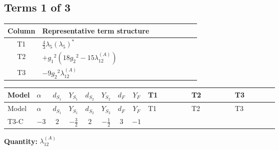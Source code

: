 \documentclass[8pt]{article}
\begin{document}
\begin{landscape}
\subsection*{Terms 1 of 3}
\begin{center}
\begin{tabular}{@{}c >{\raggedright\arraybackslash}p{0.82\linewidth}@{}}
\toprule
Column & Representative term structure \\
\midrule
T1 & \(\displaystyle \frac{4}{3} {\lambda_5} \left({\lambda_5}\right)^{*}\) \\
\midrule
T2 & \(\displaystyle +{g_1}^2 \left(18 {g_2}^2-15 {\lambda_{12}^{(A)}}\right)\) \\
\midrule
T3 & \(\displaystyle -9 {g_2}^2 {\lambda_{12}^{(A)}}\) \\
\midrule
\bottomrule
\end{tabular}
\end{center}
\smallskip
\tiny
\begin{longtable}{@{}llcccccc >{\raggedright\arraybackslash}p{0.21\linewidth} >{\raggedright\arraybackslash}p{0.21\linewidth} >{\raggedright\arraybackslash}p{0.21\linewidth}@{}}
\toprule
Model & $\alpha$ & $d_{S_1}$ & $Y_{S_1}$ & $d_{S_2}$ & $Y_{S_2}$ & $d_F$ & $Y_F$ & T1 & T2 & T3 \\
\midrule
\endfirsthead
\toprule
Model & $\alpha$ & $d_{S_1}$ & $Y_{S_1}$ & $d_{S_2}$ & $Y_{S_2}$ & $d_F$ & $Y_F$ & T1 & T2 & T3 \\
\midrule
\endhead
T3-C & $-3$ & $2$ & $-\frac{3}{2}$ & $2$ & $-\frac{1}{2}$ & $3$ & $-1$ & \scriptsize\adjustbox{max width=\linewidth}{$\begin{gathered} \frac{4}{3} {\lambda_5} \left({\lambda_5}\right)^{*}\end{gathered}$} & \scriptsize\adjustbox{max width=\linewidth}{$\begin{gathered} +{g_1}^2 \left(18 {g_2}^2-15 {\lambda_{12}^{(A)}}\right)\end{gathered}$} & \scriptsize\adjustbox{max width=\linewidth}{$\begin{gathered} -9 {g_2}^2 {\lambda_{12}^{(A)}}\end{gathered}$} \\
\midrule
\bottomrule
\end{longtable}
\clearpage
\noindent\textbf{Quantity: }$\lambda_{12}^{(A)}$\par\smallskip

\end{landscape}
\end{document}
